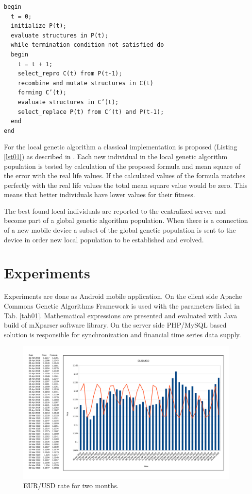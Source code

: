 \documentclass[graybox]{svmult}
\begin{document}
\begin{lstlisting}[caption={Genetic algorithm pseudo-code.},label={lst01},backgroundcolor=\color{very-light-gray},frame={single}]
begin
  t = 0;
  initialize P(t);
  evaluate structures in P(t);
  while termination condition not satisfied do
  begin
    t = t + 1;
    select_repro C(t) from P(t-1);
    recombine and mutate structures in C(t)
    forming C’(t);
    evaluate structures in C’(t);
    select_replace P(t) from C’(t) and P(t-1);
  end
end
\end{lstlisting}
\FloatBarrier

For the local genetic algorithm a classical implementation is proposed (Listing \ref{lst01}) as described in \cite{baeck01}. Each new individual in the local genetic algorithm population is tested by calculation of the proposed formula and mean square of the error with the real life values. If the calculated values of the formula matches perfectly with the real life values the total mean square value would be zero. This means that better individuals have lower values for their fitness.

The best found local individuals are reported to the centralized server and become part of a global genetic algorithm population. When there is a connection of a new mobile device a subset of the global genetic population is sent to the device in order new local population to be established and evolved.

\section{Experiments} \label{Experiments}

Experiments are done as Android mobile application. On the client side Apache Commons Genetic Algorithms Framework \cite{apache01} is used with the parameters listed in Tab. \ref{tab01}. Mathematical expressions are presented and evaluated with Java build of mXparser \cite{gromada01} software library. On the server side PHP/MySQL based solution \cite{balabanov03} is responsible for synchronization and financial time series data supply. 

\begin{figure}[b]
\sidecaption
\includegraphics[scale=0.15]{fig01.png}
\caption{EUR/USD rate for two months.}
\label{fig01}
\end{figure}
\FloatBarrier
\end{document}
